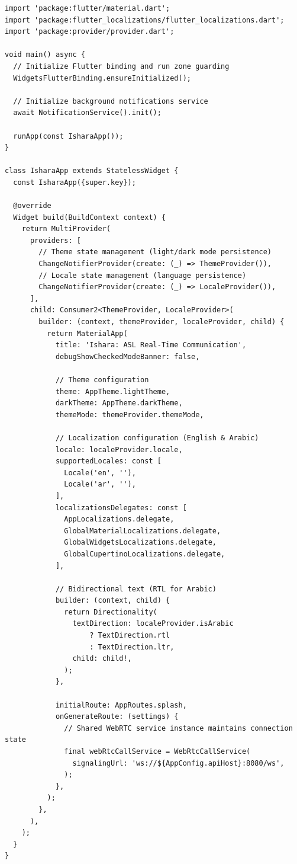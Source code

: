 \documentclass[11pt,a4paper,twoside]{report}
\begin{document}
\begin{lstlisting}[style=dart, caption={Main application initialization with multi-language and theme support}, label=lst:main-dart]
import 'package:flutter/material.dart';
import 'package:flutter_localizations/flutter_localizations.dart';
import 'package:provider/provider.dart';

void main() async {
  // Initialize Flutter binding and run zone guarding
  WidgetsFlutterBinding.ensureInitialized();
  
  // Initialize background notifications service
  await NotificationService().init();
  
  runApp(const IsharaApp());
}

class IsharaApp extends StatelessWidget {
  const IsharaApp({super.key});

  @override
  Widget build(BuildContext context) {
    return MultiProvider(
      providers: [
        // Theme state management (light/dark mode persistence)
        ChangeNotifierProvider(create: (_) => ThemeProvider()),
        // Locale state management (language persistence)
        ChangeNotifierProvider(create: (_) => LocaleProvider()),
      ],
      child: Consumer2<ThemeProvider, LocaleProvider>(
        builder: (context, themeProvider, localeProvider, child) {
          return MaterialApp(
            title: 'Ishara: ASL Real-Time Communication',
            debugShowCheckedModeBanner: false,
            
            // Theme configuration
            theme: AppTheme.lightTheme,
            darkTheme: AppTheme.darkTheme,
            themeMode: themeProvider.themeMode,
            
            // Localization configuration (English & Arabic)
            locale: localeProvider.locale,
            supportedLocales: const [
              Locale('en', ''),
              Locale('ar', ''),
            ],
            localizationsDelegates: const [
              AppLocalizations.delegate,
              GlobalMaterialLocalizations.delegate,
              GlobalWidgetsLocalizations.delegate,
              GlobalCupertinoLocalizations.delegate,
            ],
            
            // Bidirectional text (RTL for Arabic)
            builder: (context, child) {
              return Directionality(
                textDirection: localeProvider.isArabic 
                    ? TextDirection.rtl 
                    : TextDirection.ltr,
                child: child!,
              );
            },
            
            initialRoute: AppRoutes.splash,
            onGenerateRoute: (settings) {
              // Shared WebRTC service instance maintains connection state
              final webRtcCallService = WebRtcCallService(
                signalingUrl: 'ws://${AppConfig.apiHost}:8080/ws',
              );
            },
          );
        },
      ),
    );
  }
}
\end{lstlisting}
\end{document}

